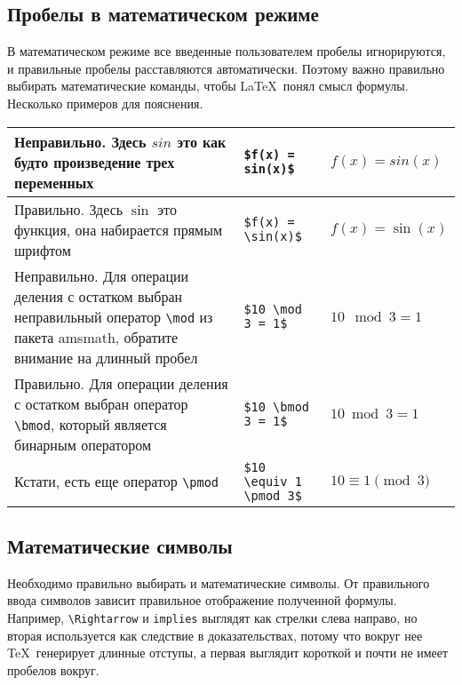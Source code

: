 \documentclass{article}
\begin{document}
    \subsection{Пробелы в математическом режиме}
    В математическом режиме все введенные пользователем пробелы игнорируются, и правильные пробелы расставляются автоматически.
    Поэтому важно правильно выбирать математические команды, чтобы \LaTeX\ понял смысл формулы.
    Несколько примеров для пояснения.

    \begin{table}[H]
        \begin{tabular}{|p{} | l  | l |}
            \hline
            Неправильно. Здесь $sin$ это как будто произведение трех переменных                                                                          & \verb|$f(x) = sin(x)$|       & $f(x) = sin(x)$       \\
            \hline
            Правильно. Здесь $\sin$ это функция, она набирается прямым шрифтом                                                                           & \verb|$f(x) = \sin(x)$|      & $f(x) = \sin(x)$      \\
            \hline
            Неправильно. Для операции деления с остатком выбран неправильный оператор \verb|\mod| из пакета amsmath, обратите внимание на длинный пробел & \verb|$10 \mod 3 = 1$|       & $10 \mod 3 = 1$       \\
            \hline
            Правильно. Для операции деления с остатком выбран оператор \verb|\bmod|, который является бинарным оператором                                & \verb|$10 \bmod 3 = 1$|      & $10 \bmod 3 = 1$      \\
            \hline
            Кстати, есть еще оператор \verb|\pmod|                                                                                                       & \verb|$10 \equiv 1 \pmod 3$| & $10 \equiv 1 \pmod 3$ \\
            \hline
        \end{tabular}
    \end{table}

    \subsection{Математические символы}
    Необходимо правильно выбирать и математические символы. От правильного ввода символов
    зависит правильное отображение полученной формулы. Например, \verb|\Rightarrow| и \verb|implies|
    выглядят как стрелки слева направо, но вторая используется как следствие в доказательствах, потому
    что вокруг нее \TeX\ генерирует длинные отступы, а первая выглядит короткой и почти не имеет
    пробелов вокруг.
\end{document}
